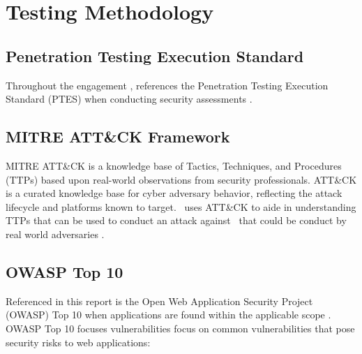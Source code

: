 \section{Testing Methodology}
\subsection{Penetration Testing Execution Standard}
    Throughout the engagement \teamname, references the Penetration Testing Execution Standard (PTES) when conducting security assessments \cite{PTES}.
    

\subsection{MITRE ATT\&CK Framework}

    MITRE ATT\&CK is a knowledge base of Tactics, Techniques, and Procedures (TTPs) based upon real-world observations from security professionals. ATT\&CK is a curated knowledge base for cyber adversary behavior, reflecting the attack lifecycle and platforms known to target. \teamname\ uses ATT\&CK to aide in understanding TTPs that can be used to conduct an attack against \cptc\ that could be conduct by real world adversaries \cite{attack}.

\subsection{OWASP Top 10}

    Referenced in this report is the Open Web Application Security Project (OWASP) Top 10 when applications are found within the applicable scope \cite{owasptop10}. OWASP Top 10 focuses vulnerabilities focus on common vulnerabilities that pose security risks to web applications:
    \setlength\arrayrulewidth{1.25pt}

